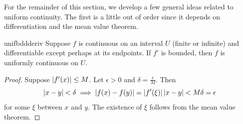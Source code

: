% 
 	
 	

For the remainder of this section, we develop a few general ideas related to uniform continuity. The first is a little out of order since it depends on differentiation and the mean value theorem.

\begin{thm}{}{unifbddderiv}
	Suppose $f$ is continuous on an interval $U$ (finite or infinite) and differentiable except perhaps at its endpoints. If $f'$ is bounded, then $f$ is uniformly continuous on $U$.
\end{thm}

\begin{proof}
	Suppose $\left| f'(x)\right|\le M$. Let $\epsilon>0$ and $\delta=\frac\epsilon M$. Then
	\[
		\left| x-y\right|<\delta\implies \left| f(x)-f(y)\right|=\left| f'(\xi)\right|\left| x-y\right|<M\delta=\epsilon
	\]
	for some $\xi$ between $x$ and $y$. The existence of $\xi$ follows from the mean value theorem.\footnotemark{}
\end{proof}


